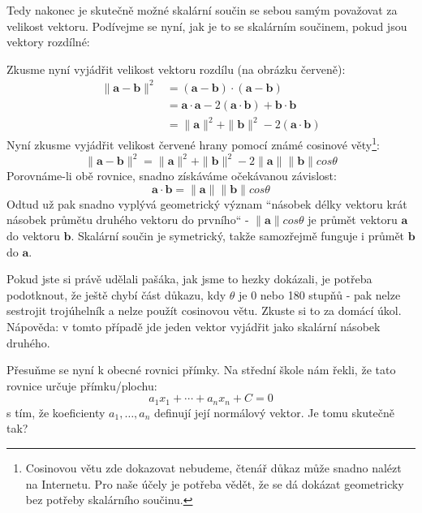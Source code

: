 \documentclass[a5paper,12pt]{amsbook}
\theoremstyle{definition}
\newcommand{\myvec}[1]{\mathbf{#1}}
\begin{document}
Tedy nakonec je skutečně možné skalární součin se sebou samým považovat za velikost vektoru. Podívejme
se nyní, jak je to se skalárním součinem, pokud jsou vektory rozdílné:
\begin{center}

\end{center}
Zkusme nyní vyjádřit velikost vektoru rozdílu (na obrázku červeně):
\begin{equation*}
\begin{split}
\|\myvec{a}-\myvec{b}\|^2 &= (\myvec{a}-\myvec{b})\cdot(\myvec{a}-\myvec{b}) \\
  &= \myvec{a}\cdot\myvec{a} - 2(\myvec{a}\cdot\myvec{b}) + \myvec{b}\cdot\myvec{b} \\
  &= \|\myvec{a}\|^2 + \|\myvec{b}\|^2 - 2(\myvec{a}\cdot\myvec{b})
\end{split}
\end{equation*}
Nyní zkusme vyjádřit velikost červené hrany pomocí známé cosinové věty\footnote{
  Cosinovou větu zde dokazovat nebudeme, čtenář důkaz může snadno nalézt na Internetu. Pro naše účely
  je potřeba vědět, že se dá dokázat geometricky bez potřeby skalárního součinu.
}:
\begin{equation*}
\|\myvec{a}-\myvec{b}\|^2 = \|\myvec{a}\|^2 + \|\myvec{b}\|^2 - 2\|\myvec{a}\|\|\myvec{b}\|cos\theta
\end{equation*}
Porovnáme-li obě rovnice, snadno získáváme očekávanou závislost:
\begin{equation*}
\myvec{a}\cdot\myvec{b} = \|\myvec{a}\|\|\myvec{b}\|cos\theta
\end{equation*}
Odtud už pak snadno vyplývá geometrický význam ``násobek délky vektoru krát násobek průmětu druhého
vektoru do prvního`` - $\|\myvec{a}\|cos\theta$ je průmět vektoru $\myvec{a}$ do vektoru $\myvec{b}$.
Skalární součin je symetrický, takže samozřejmě funguje i průmět $\myvec{b}$ do $\myvec{a}$.

Pokud jste si právě udělali pašáka, jak jsme to hezky dokázali, je potřeba podotknout, že ještě chybí
část důkazu, kdy $\theta$ je 0 nebo 180 stupňů - pak nelze sestrojit trojúhelník a nelze použít
cosinovou větu. Zkuste si to za domácí úkol. Nápověda: v tomto případě jde jeden vektor vyjádřit
jako skalární násobek druhého.

\medskip\noindent
Přesuňme se nyní k obecné rovnici přímky. Na střední škole nám řekli, že tato rovnice určuje
přímku/plochu:
\begin{equation*}
a_1x_1 + \cdots + a_nx_n + C = 0
\end{equation*}
s tím, že koeficienty $a_1, \ldots, a_n$ definují její normálový vektor. Je tomu skutečně tak?
\end{document}
